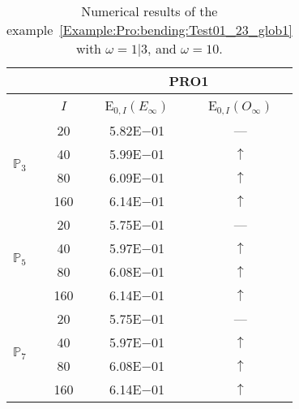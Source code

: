 \begin{table}[H]
\caption{Numerical results of the example~\ref{Example:Pro:bending:Test01_23_glob1} with $\omega=1|3$, and $\omega=10$.}
\setlength{\tabcolsep}{5pt}
\centering
\begin{tabular}{@{}l c c c@{}}
\toprule
 &  & \multicolumn{2}{c}{PRO1}\\
\midrule
 & $I$ & E$_{0,I}(E_{\infty})$ & E$_{0,I}(O_{\infty})$\\
\midrule
\multirow{4}{*}{$\mathbb{P}_{3}$} & 20 & 5.82E$-$01 & ---\\
 & 40 & 5.99E$-$01 & $\uparrow$\\
 & 80 & 6.09E$-$01 & $\uparrow$\\
 & 160 & 6.14E$-$01 & $\uparrow$\\
\midrule
\multirow{4}{*}{$\mathbb{P}_{5}$} & 20 & 5.75E$-$01 & ---\\
 & 40 & 5.97E$-$01 & $\uparrow$\\
 & 80 & 6.08E$-$01 & $\uparrow$\\
 & 160 & 6.14E$-$01 & $\uparrow$\\
\midrule
\multirow{4}{*}{$\mathbb{P}_{7}$} & 20 & 5.75E$-$01 & ---\\
 & 40 & 5.97E$-$01 & $\uparrow$\\
 & 80 & 6.08E$-$01 & $\uparrow$\\
 & 160 & 6.14E$-$01 & $\uparrow$\\
\bottomrule
\end{tabular}
\label{Table:PRO:test_01_23_test4}
\end{table}
